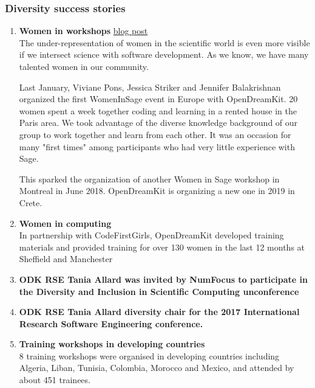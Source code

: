 \subsubsection{Diversity success stories}



\begin{enumerate}
\item \textbf{Women in \Sage workshops} \href{https://opendreamkit.org/2017/04/06/WomenInSage/}{blog post}\\
  The under-representation of women in the scientific world is even
  more visible if we intersect science with software development. As
  we know, we have many talented women in our community.

  Last January, Viviane Pons, Jessica Striker and Jennifer
  Balakrishnan organized the first WomenInSage event in Europe with
  OpenDreamKit. 20 women spent a week together coding and learning in
  a rented house in the Paris area. We took advantage of the diverse
  knowledge background of our group to work together and learn from
  each other. It was an occasion for many "first times" among
  participants who had very little experience with Sage.

  This sparked the organization of another Women in Sage workshop in
  Montreal in June 2018. OpenDreamKit is organizing a new one in 2019
  in Crete.

\item \textbf{Women in computing}\\
  In partnership with CodeFirstGirls, OpenDreamKit developed training
  materials and provided training for over 130 women in the last 12
  months at Sheffield and Manchester

\item \textbf{ODK RSE Tania Allard was invited by NumFocus to
    participate in the Diversity and Inclusion in Scientific Computing
    unconference}

\item \textbf{ODK RSE Tania Allard diversity chair for the 2017
    International Research Software Engineering conference.}

\item \textbf{Training workshops in developing countries }\\
  8 training workshops were organised in developing countries
  including Algeria, Liban, Tunisia, Colombia, Morocco and Mexico, and
  attended by about 451 trainees.
\end{enumerate}

